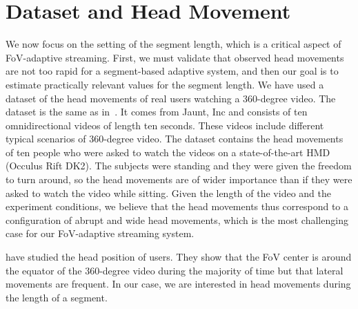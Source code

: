 \section{Dataset and Head Movement}
\label{sec:dataset}

We now focus on the setting of the segment length, which is a critical aspect of FoV-adaptive streaming.
First, we must validate that observed head movements are not too rapid for a segment-based
adaptive system, and then our goal is to
estimate practically relevant values for the segment length.
We have used a dataset of the head movements of real users watching
a 360-degree video. The dataset is the same as in~\cite{yu_framework_2015}. It comes from
Jaunt, Inc and consists of ten omnidirectional videos of length ten seconds. These videos include
different typical scenarios of 360-degree video. The dataset contains the head movements of
ten people who were asked to watch the videos on a state-of-the-art \ac{HMD} (Occulus Rift DK2).
The subjects were standing and they were given the freedom to turn around, so the head movements
are of wider importance than if they were asked to watch the video while sitting. Given the length of
the video and the experiment conditions, we believe that the head movements thus correspond to
a configuration of abrupt and wide head movements, which is the most challenging case for our FoV-adaptive streaming system.

\citet{yu_framework_2015} have studied the head position of users. They show that the
FoV center is around the equator of the 360-degree video
during the majority of time but that lateral movements are frequent. In our case, we are interested in head
movements during the length of a segment.

